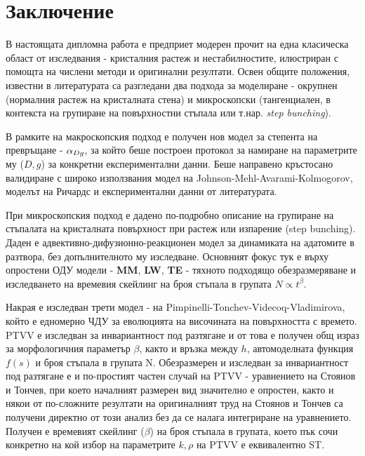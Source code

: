 \section{Заключение}
В настоящата дипломна работа е предприет модерен прочит на една класическа област от изследвания - кристалния растеж и нестабилностите, илюстриран с помощта на числени методи и оригинални резултати. Освен общите положения, известни в литературата са разгледани два подхода за моделиране - окрупнен (нормалния растеж на кристалната стена) и микроскопски (тангенциален, в контекста на групиране на повърхностни стъпала или т.нар. \textit{step bunching}).

В рамките на макроскопския подход е получен нов модел за степента на превръщане - $\alpha_{Dg}$, за който беше построен протокол за намиране на параметрите му ($D, g$) за конкретни експериментални данни. Беше направено кръстосано валидиране с широко използвания модел на Johnson-Mehl-Avarami-Kolmogorov, моделът на Ричардс и експериментални данни от литературата.

При микроскопския подход е дадено по-подробно описание на групиране на стъпалата на кристалната повърхност при растеж или изпарение (step bunching). Даден е адвективно-дифузионно-реакционен модел за динамиката на адатомите в разтвора, без допълнителното му изследване. Основният фокус тук е върху опростени ОДУ модели - \textbf{MM}, \textbf{LW}, \textbf{TE} - тяхното подходящо обезразмеряване и изследването на времевия скейлинг на броя стъпала в групата $N \propto t^\beta$. 

Накрая е изследван трети модел - на Pimpinelli-Tonchev-Videcoq-Vladimirova, който е едномерно ЧДУ за еволюцията на височината на повърхността с времето.  PTVV е изследван за инвариантност под разтягане и от това е получен общ израз за морфологичния параметър $\beta$, както и връзка между $h$, автомоделната функция $f(s)$ и броя стъпала в групата N. Обезразмерен и изследван за инвариантност под разтягане е и по-простият частен случай на PTVV - уравнението на Стоянов и Тончев, при което началният размерен вид значително е опростен, както и някои от по-сложните резултати на оригиналният труд на Стоянов и Тончев са получени директно от този анализ без да се налага интегриране на уравнението. Получен е времевият скейлинг ($\beta$) на броя стъпала в групата, което пък сочи конкретно на кой избор на параметрите $k, \rho$ на PTVV е еквивалентно ST.
